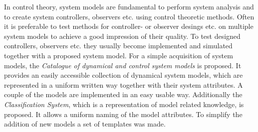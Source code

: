 \documentclass[arbeit=studie, oneside, BCOR=12mm]{ArbeitRST}
\begin{document}
{In control theory, system models are fundamental to perform system analysis and to create system controllers, observers etc. using control theoretic methods. Often it is preferable to test methods for controller- or observer desings etc. on multiple system models to achieve a good impression of their quality. To test designed controllers, observers etc. they usually become implemented and simulated together with a proposed system model. For a simple acquisition of system models, the \textit{Catalogue of dynamical and control system models} is proposed. It provides an easily accessible collection of dynamical system models, which are represented in a uniform written way together with their system attributes. A couple of the models are implemented in an easy usable way. Additionally the \textit{Classification System}, which is a representation of model related knowledge, is proposed. It allows a uniform naming of the model attributes. To simplify the addition of new models a set of templates was made.}%


\tableofcontents



\listoffigures


\listoftables



\pagestyle{scrheadings}

\end{document}
